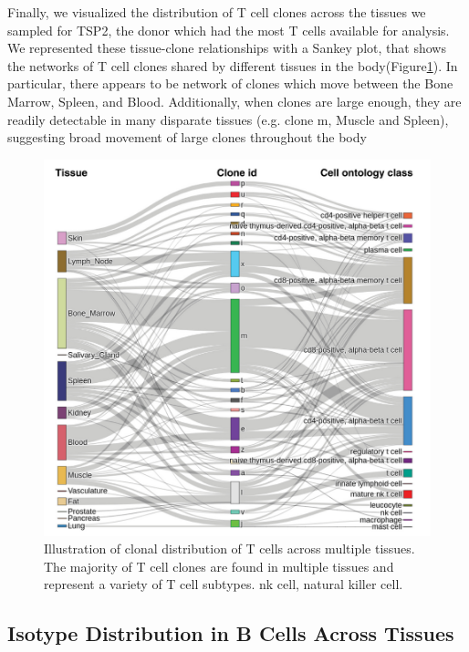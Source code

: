 Finally, we visualized the distribution of T cell clones across the tissues we sampled for TSP2, the donor which had the most T cells available for analysis. We represented these tissue-clone relationships with a Sankey plot, that shows the networks of T cell clones shared by different tissues in the body(Figure\ref{fig:paper1_sankey}). In particular, there appears to be network of clones which move between the Bone Marrow, Spleen, and Blood. Additionally, when clones are large enough, they are readily detectable in many disparate tissues (e.g. clone m, Muscle and Spleen), suggesting broad movement of large clones throughout the body    
\begin{figure}[hbt!]
\centering
\includegraphics[width=14cm, keepaspectratio]{figs/paper1/fig4_sankey.png}
\caption[Sankey Plot of T cell clones in Tabula Sapiens]{Illustration of clonal distribution of T cells across multiple tissues. The majority of T cell clones are found in multiple tissues and represent a variety of T cell subtypes. nk cell, natural killer cell.}
\label{fig:paper1_sankey}
\end{figure}



\subsection{Isotype Distribution in B Cells Across Tissues}

